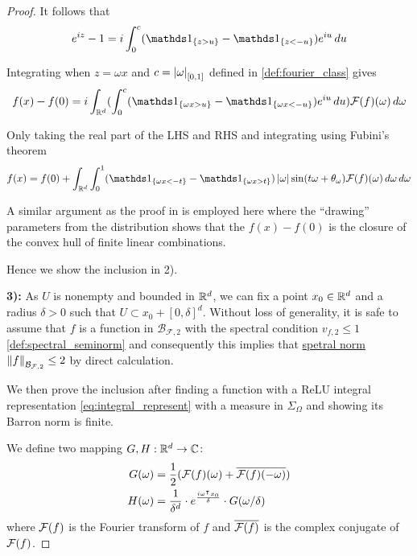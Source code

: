 \begin{proof}
It follows that
\begin{equation}
    e^{iz} - 1 = i \int_0^c (
        \indicator{\{z>u\}} - \indicator{\{z<-u\}}  
    )
    e^{iu} \,du 
\end{equation}

Integrating when $z = \omega x$ and $c=\left| \omega \right|_{[0,1]}$ defined in
\eqref{def:fourier_class} gives
\begin{equation}
    f(x) -f(0) = i\int_{\R^d} (\int_0^{c} (
        \indicator{\{\omega x>u\}} - \indicator{\{\omega x<-u\}}
    ) e^{iu}\,du)
    \fourier{f}(\omega)\,d\omega
\end{equation}

Only taking the real part of the LHS and RHS and integrating using Fubini's theorem
\begin{equation}
    f(x) = f(0) + \int_{\R^d} \int_0^1 (
        \indicator{\{\omega x<-t\}} - \indicator{\{\omega x>t\}}
    ) \abs{\omega} \sin(t\omega + \theta_{\omega})
    \fourier{f}(\omega)\,d\omega\,d\omega
\end{equation}

A similar argument as the proof in  is employed here
where the ``drawing'' parameters from the distribution shows that the $f(x) -
f(0)$ is the closure of the convex hull of finite linear combinations.

Hence we show the inclusion in 2).

\textbf{3):} As $U$ is nonempty and bounded in $\mathbb{R}^d$, we can fix a point $x_0
\in \mathbb{R}^d$ and a radius $\delta > 0$ such that $U \subset x_0 + [0,\delta]^d$.
Without loss of generality, it is safe to assume that $f$ is a function in
$\mathcal{B}_{\mathcal{F},2}$ with the spectral condition $v_{f,2}\leq 1$
\eqref{def:spectral_seminorm} and consequently this implies that
\hyperref[def:spectral_norm]{spetral norm} $\left\| f \right\|_{\mathcal{B}_{\mathcal{F}, 2}} \leq
2$ by direct calculation. 

We then prove the inclusion after finding a function with a ReLU integral
representation \eqref{eq:integral_represent} with a measure in $\Sigma_{\Omega}$
and showing its Barron norm is finite.

We define two mapping $G, H: \mathbb{R}^d \to \mathbb{C}$:
\begin{align*}
    G(\omega) &= \frac{1}{2} (\mathcal{F}(f)(\omega) 
                    + \overline{\mathcal{F}(f)(-\omega)}) \\
    H(\omega) &= \frac{1}{\delta^d} \cdot 
                    e^{\frac{i \omega{}^{\intercal} x_0}{\delta}} \cdot 
                    G(\omega / \delta)
\end{align*}
where $\mathcal{F}(f)$ is the Fourier transform of $f$ and $\overline{\mathcal{F}(f)}$
is the complex conjugate of $\mathcal{F}(f)$.


\end{proof}
